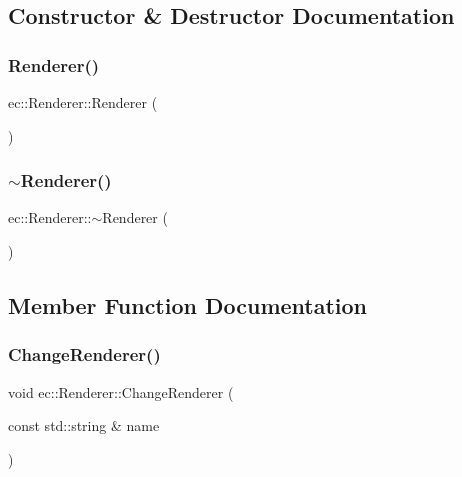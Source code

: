 \subsection{Constructor \& Destructor Documentation}
\mbox{\label{classec_1_1_renderer_a1bb0d9ff47eabce408daff8ab55bf4dc}} 
\subsubsection{\texorpdfstring{Renderer()}{Renderer()}}
{\footnotesize\ttfamily ec\+::\+Renderer\+::\+Renderer (\begin{DoxyParamCaption}{ }\end{DoxyParamCaption})\hspace{0.3cm}{\ttfamily [explicit]}}

\mbox{\label{classec_1_1_renderer_ab0a97bd174127b670899477a576d1fe6}} 
\subsubsection{\texorpdfstring{$\sim$\+Renderer()}{~Renderer()}}
{\footnotesize\ttfamily ec\+::\+Renderer\+::$\sim$\+Renderer (\begin{DoxyParamCaption}{ }\end{DoxyParamCaption})}



\subsection{Member Function Documentation}
\mbox{\label{classec_1_1_renderer_a8c84ae50f78cd6a4ed913d228716ad9b}} 
\subsubsection{\texorpdfstring{Change\+Renderer()}{ChangeRenderer()}}
{\footnotesize\ttfamily void ec\+::\+Renderer\+::\+Change\+Renderer (\begin{DoxyParamCaption}\item[{const std\+::string \&}]{name }\end{DoxyParamCaption})}


